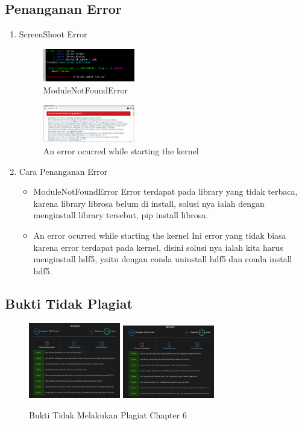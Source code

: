 \subsection{Penanganan Error}
\begin{enumerate}
	\item ScreenShoot Error
	\begin{figure}[H]
		\includegraphics[width=4cm]{figures/1174021/tugas6/error/1.PNG}
		\centering
		\caption{ModuleNotFoundError}
	\end{figure}

	\begin{figure}[H]
		\includegraphics[width=4cm]{figures/1174021/tugas6/error/2.PNG}
		\centering
		\caption{An error ocurred while starting the kernel}
	\end{figure}

	\item Cara Penanganan Error
	\begin{itemize}
		\item ModuleNotFoundError
		\hfill\break
		Error terdapat pada library yang tidak terbaca, karena library librosa belum di install, solusi nya ialah dengan menginstall library tersebut, pip install librosa.
		\item An error ocurred while starting the kernel
		\hfill\break
		Ini error yang tidak biasa karena error terdapat pada kernel, disini solusi nya ialah kita harus menginstall hdf5, yaitu dengan conda uninstall hdf5 dan conda install hdf5.
	\end{itemize}
\end{enumerate}

\subsection{Bukti Tidak Plagiat}
\begin{figure}[H]
\centering
	\includegraphics[width=4cm]{figures/1174021/tugas6/buktiplagiat/1.PNG}
	\includegraphics[width=4cm]{figures/1174021/tugas6/buktiplagiat/2.PNG}
	\caption{Bukti Tidak Melakukan Plagiat Chapter 6}
\end{figure}


